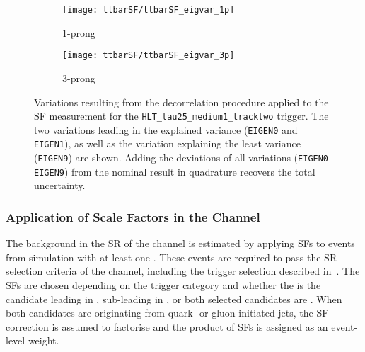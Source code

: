 \begin{figure}[htbp]
  \centering

  \begin{subfigure}[t]{.495\textwidth}
    \texttt{[image: ttbarSF/ttbarSF\_eigvar\_1p]}
    \caption{1-prong \tauhadvis}
    \label{fig:ttbarSF_eigenvariations_1p}
  \end{subfigure}\hfill%
  \begin{subfigure}[t]{.495\textwidth}
    \texttt{[image: ttbarSF/ttbarSF\_eigvar\_3p]}
    \caption{3-prong \tauhadvis}
    \label{fig:ttbarSF_eigenvariations_3p}
  \end{subfigure}

  \caption[Systematic variations of the \faketauhadvis SFs for the
  \texttt{HLT\_tau25\_medium1\_tracktwo} trigger.]{Variations resulting from the
    decorrelation procedure applied to the SF measurement for the
    \texttt{HLT\_tau25\_medium1\_tracktwo} trigger. The two variations leading
    in the explained variance (\texttt{EIGEN0} and \texttt{EIGEN1}), as well as
    the variation explaining the least variance (\texttt{EIGEN9}) are
    shown. Adding the deviations of all variations
    (\texttt{EIGEN0}--\texttt{EIGEN9}) from the nominal result in quadrature
    recovers the total uncertainty.}%
  \label{fig:ttbarSF_eigenvariations}
\end{figure}


\subsubsection{Application of \Faketauhadvis Scale Factors in the \hadhad
  Channel}

The \ttbarFakes background in the SR of the \hadhad channel is estimated by
applying \faketauhadvis SFs to \ttbar events from simulation with at least one
\faketauhadvis. These events are required to pass the SR selection criteria of
the \hadhad channel, including the trigger selection described
in~. The SFs are chosen depending on the trigger category and
whether the \faketauhadvis is the \tauhadvis candidate leading in \pT,
sub-leading in \pT, or both selected candidates are \faketauhadvis. When both
\tauhadvis candidates are originating from quark- or gluon-initiated jets, the
SF correction is assumed to factorise and the product of SFs is assigned as an
event-level weight.


